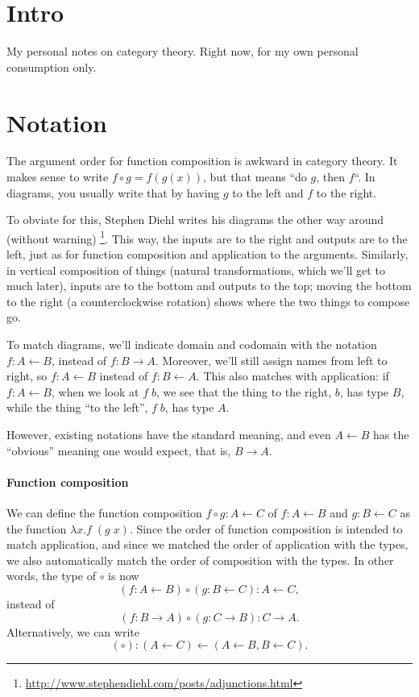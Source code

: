 \documentclass{article}
\newcommand{\from}{\leftarrow}
\newcommand{\ap}{\;}
\newcommand{\Gl}{\lambda}
\begin{document}
\section{Intro}
My personal notes on category theory.
Right now, for my own personal consumption only.
\section{Notation}
The argument order for function composition is awkward in category theory. It
makes sense to write $f \circ g = f(g(x))$, but that means ``do $g$, then $f$``.
In diagrams, you usually write that by having $g$ to the left and $f$ to the right.

To obviate for this, Stephen Diehl writes his diagrams the other way around
(without warning)%
\footnote{\url{http://www.stephendiehl.com/posts/adjunctions.html}}.
%
This way, the inputs are to the right and outputs are to the left, just as for
function composition and application to the arguments. Similarly, in vertical
composition of things (natural transformations, which we'll get to much later),
inputs are to the bottom and outputs to the top; moving the bottom to the right
(a counterclockwise rotation) shows where the two things to compose go.

To match diagrams, we'll indicate domain and codomain with the notation $f: A
\from B$, instead of $f: B \to A$. Moreover, we'll still assign names from left
to right, so $f: A \from B$ instead of $f: B \from A$. This also matches with
application: if $f: A \from B$, when we look at $f\ap b$, we see that the thing to
the right, $b$, has type $B$, while the thing ``to the left'', $f\ap b$, has type
$A$.

However, existing notations have the standard meaning, and even $A \from B$ has
the ``obvious'' meaning one would expect, that is, $B \to A$.

\paragraph{Function composition}
We can define the function composition $f \circ g: A \from C$ of $f: A \from B$
and $g: B \from C$ as the function $\Gl x. f\ap (g\ap x)$. Since the order of
function composition is intended to match application, and since we matched the
order of application with the types, we also automatically match the order of
composition with the types. In other words, the type of $\circ$ is now
\[(f : A
\from B) \circ (g: B \from C) : A \from C,\]
instead of
\[(f : B \to A) \circ (g: C \to B) : C \to A.\]
%
Alternatively, we can write
\[(\circ): (A \from C) \from (A \from B, B \from C).\]
\end{document}
